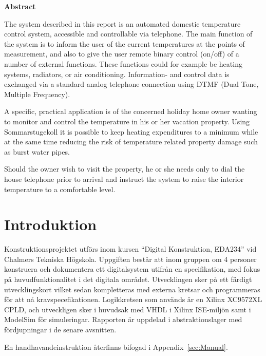 \documentclass[a4paper,11pt]{article}
\begin{document}
\begin{center}
	{\noindent \bf Abstract}
\end{center}

	The system described in this report is an automated domestic temperature control system, accessible and controllable via
	telephone. The main function of the system is to inform the user of the current temperatures
	at the points of measurement, and also to give the user remote binary control (on/off) of a number of external
	functions. These functions could for example be heating systems, radiators, or air conditioning. Information- and control data
	is exchanged via a standard analog telephone connection using DTMF (Dual Tone, Multiple Frequency).

	A specific, practical application is of the concerned holiday home owner wanting to monitor and control the temperature 
	in his or her vacation property. Using Sommarstugekoll it is possible to keep heating expenditures to a minimum while at 
	the same time reducing the risk of temperature related property damage such as burst water pipes.

	Should the owner wish to visit the property, he or she needs only to dial the house telephone prior to arrival and instruct the system to raise
	the interior temperature to a comfortable level. 

 \thispagestyle{empty}
\pagebreak

\setcounter{page}{1}
\section{Introduktion}

	Konstruktionsprojektet utförs inom kursen ``Digital Konstruktion, EDA234'' vid Chalmers Tekniska Högskola. Uppgiften består att inom gruppen om 4 personer konstruera och dokumentera
	ett digitalsystem utifrån en specifikation, med fokus på huvudfunktionalitet i det digitala området. Utvecklingen sker på ett färdigt utvecklingskort vilket sedan kompletteras med externa kretsar och programmeras för att nå kravspecefikationen. Logikkretsen som används är en Xilinx XC9572XL CPLD, och utveckligen sker i huvudsak med VHDL i Xilinx ISE-miljön samt i ModelSim för simuleringar. Rapporten är uppdelad i abstraktionslager med fördjupningar i de senare avsnitten. 

	En handhavandeinstruktion återfinns bifogad i Appendix~\ref{sec:Manual}.

\pagebreak
\end{document}
